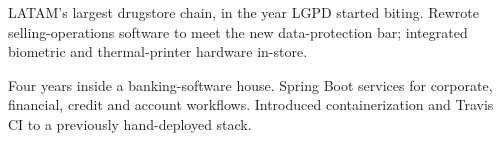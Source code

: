 \documentclass[10pt,a4paper,ragged2e]{altacv}
\begin{document}
\divider

LATAM's largest drugstore chain, in the year LGPD started biting. Rewrote selling-operations software to meet the new data-protection bar; integrated biometric and thermal-printer hardware in-store.

\divider

Four years inside a banking-software house. Spring Boot services for corporate, financial, credit and account workflows. Introduced containerization and Travis CI to a previously hand-deployed stack.

\clearpage
\end{document}
